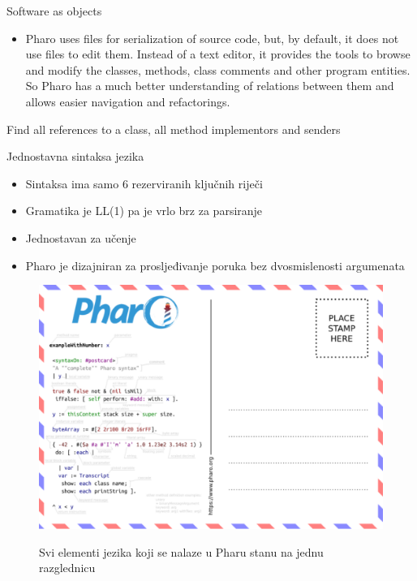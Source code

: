\documentclass{beamer}
\begin{document}
\begin{frame}{Software as objects}
\begin{itemize}
    \item Pharo uses files for serialization of source code, but, by default, it does not use files to edit them. Instead of a text editor, it provides the tools to browse and modify the classes, methods, class comments and other program entities. So Pharo has a much better understanding of relations between them and allows easier navigation and refactorings.
\end{itemize}
\begin{block}{}
Find all references to a class, all method implementors and senders
\end{block}
\end{frame}

\begin{frame}{Jednostavna sintaksa jezika}
\begin{itemize}
    \item Sintaksa ima samo 6 rezerviranih ključnih riječi
    \item Gramatika je LL(1) pa je vrlo brz za parsiranje
    \item Jednostavan za učenje
    \item Pharo je dizajniran za prosljeđivanje poruka bez dvosmislenosti argumenata
\end{itemize}

\begin{figure}
    \centering
    \includegraphics[width=0.8\linewidth]{postcard.png}
    \label{fig:postcard}
    \caption{Svi elementi jezika koji se nalaze u Pharu stanu na jednu razglednicu}
\end{figure}
\end{frame}
\end{document}

